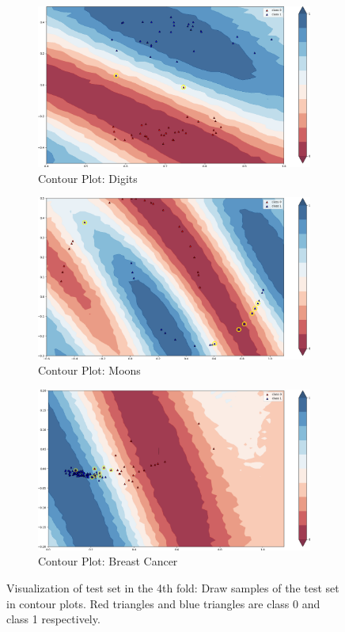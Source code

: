 \documentclass[sigconf]{acmart}
\begin{document}
\begin{figure}[!ht]
    \centering
    \begin{subfigure}{0.45\textwidth}
        \includegraphics[width=\textwidth]{./digits-2-cv4.png}
        \caption{Contour Plot: Digits}
    \end{subfigure}
    \begin{subfigure}{0.45\textwidth}
        \includegraphics[width=\textwidth]{./moons-cv4.png}
        \caption{Contour Plot: Moons}
    \end{subfigure}
    \begin{subfigure}{0.45\textwidth}
        \includegraphics[width=\textwidth]{./cancer-cv4.png}
        \caption{Contour Plot: Breast Cancer}
    \end{subfigure}
    \caption{Visualization of test set in the 4th fold: \textnormal{Draw samples of the test set in contour plots. Red triangles and blue triangles are class 0 and class 1 respectively.}}
    \label{fig:contour}
\end{figure}
\end{document}
